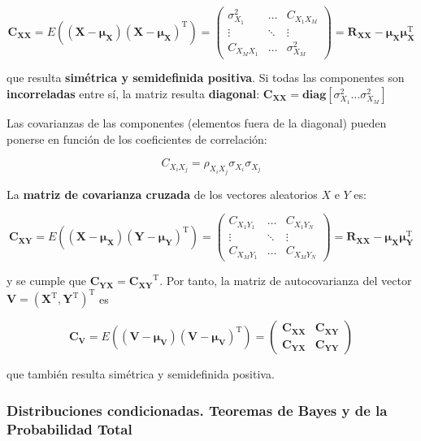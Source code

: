 \documentclass[11pt]{article}
\begin{document}
\[
\mathbf{C_{XX}} = E((\mathbf{X}-\mathbf{\mu_X})(\mathbf{X}-\mathbf{\mu_X})^\mathrm{T}) = 
\begin{pmatrix}
\sigma_{X_1}^2 & \ldots & C_{X_1X_M}\\
\vdots & \ddots & \vdots\\
C_{X_MX_1} & \ldots & \sigma_{X_M}^2
\end{pmatrix} =
\mathbf{R_{XX}}-\boldsymbol{\mu}_{\mathbf X}\boldsymbol{\mu}_{\mathbf X}^\mathrm{T}
\]

que resulta \textbf{simétrica y semidefinida positiva}. Si todas las
componentes son \textbf{incorreladas} entre sí, la matriz resulta
\textbf{diagonal}:
\(\mathbf{C_{XX}} = \mathrm{\mathbf{diag}}[\sigma_{X_1}^2\ldots \sigma_{X_M}^2]\)

Las covarianzas de las componentes (elementos fuera de la diagonal)
pueden ponerse en función de los coeficientes de correlación:

\[
C_{X_iX_j} = \rho_{X_iX_j}\sigma_{X_i}\sigma_{X_j}
\]

    La \textbf{matriz de covarianza cruzada} de los vectores aleatorios
\(X\) e \(Y\) es:

\[
\mathbf{C_{XY}} = E((\mathbf{X}-\mathbf{\mu_X})(\mathbf{Y}-\mathbf{\mu_Y})^\mathrm{T}) = 
\begin{pmatrix}
C_{X_1Y_1} & \ldots & C_{X_1Y_N}\\
\vdots & \ddots & \vdots\\
C_{X_MY_1} & \ldots &  C_{X_MY_N}
\end{pmatrix} =
\mathbf{R_{XX}}-\boldsymbol{\mu}_{\mathbf X}\boldsymbol{\mu}_{\mathbf Y}^\mathrm{T}
\]

y se cumple que \(\mathbf{C_{YX}} = \mathbf{C_{XY}}^\mathrm{T}\). Por
tanto, la matriz de autocovarianza del vector
\(\mathbf V = (\mathbf{X}^\mathrm{T} , \mathbf{Y}^\mathrm{T})^\mathrm{T}\)
es

\[
\mathbf{C_{V}} = E((\mathbf{V}-\mathbf{\mu_V})(\mathbf{V}-\mathbf{\mu_V})^\mathrm{T}) =
\begin{pmatrix}
\mathbf{C_{XX}} & \mathbf{C_{XY}}\\
\mathbf{C_{YX}} & \mathbf{C_{YY}}
\end{pmatrix}
\]

que también resulta simétrica y semidefinida positiva.

    \hypertarget{distribuciones-condicionadas.-teoremas-de-bayes-y-de-la-probabilidad-total}{%
\subsubsection{Distribuciones condicionadas. Teoremas de Bayes y de la
Probabilidad
Total}\label{distribuciones-condicionadas.-teoremas-de-bayes-y-de-la-probabilidad-total}}
\end{document}
